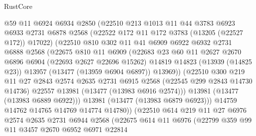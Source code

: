 \begin{lexlean}{RustCore}
\begin{coremodule}
                @59
                @11
                @6924
                @6934
                @2850
                (@22510
                  @213
                  @1013
                  @11
                  @44
                  @3783
                  @6923
                  @6933
                  @2731
                  @6878
                  @2568
                  (@22522 @172 @11 @172 @3783 (@13205 (@22527 @172)) @17022)
                  (@22510
                    @810
                    @302
                    @11
                    @41
                    @6909
                    @6922
                    @6932
                    @2731
                    @6888
                    @2568
                    (@22675
                      @810
                      @11
                      @6909
                      (@22683
                        @23
                        @60
                        @11
                        @2627
                        @2670
                        @6896
                        @6904
                        (@22693 @2627 @22696 @15262)
                        @14819
                        @14823
                        (@13939 (@14825 @23))
                        @13957
                        (@13477 (@13959 @6904 @6897))
                        @13969))
                    (@22510
                      @300
                      @219
                      @11
                      @27
                      @2843
                      @2574
                      @2635
                      @2731
                      @6915
                      @2568
                      (@22545 @299 @2843 @14730 @14736)
                      @22557
                      @13981
                      (@13477 (@13983 @6916 @2574)))
                    @13981
                    (@13477 (@13983 @6889 @6922)))
                  @13981
                  (@13477 (@13983 @6879 @6923)))
                @14759
                @14762
                @14765
                @14769
                @14774
                @14780))
            (@22510
              @614
              @219
              @11
              @27
              @6976
              @2574
              @2635
              @2731
              @6944
              @2568
              (@22675
                @614
                @11
                @6976
                (@22799
                  @359
                  @99
                  @11
                  @3457
                  @2670
                  @6952
                  @6971
                  @22814

\end{coremodule}
\end{lexlean}
